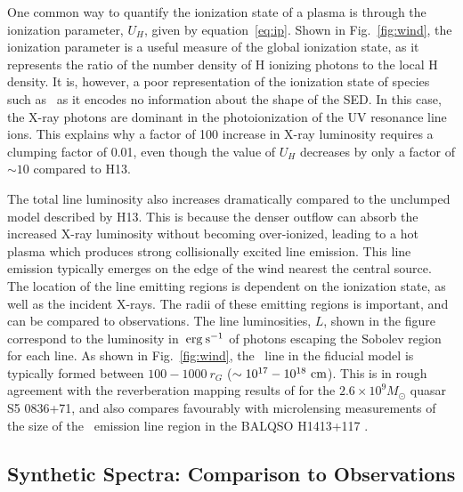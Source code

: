 One common way to quantify the ionization state of a plasma
is through the ionization parameter, $U_H$, given by equation~\ref{eq:ip}.
Shown in Fig.~\ref{fig:wind},
the ionization parameter is a useful measure of the global ionization state,
as it represents the ratio of the number density of 
H ionizing photons to the local H density.
It is, however, a poor representation of the 
ionization state of species such as \civ\ as it encodes no information
about the shape of the SED. In this case, the X-ray photons 
are dominant in the photoionization of the UV resonance line ions. 
This explains why a factor of 100 increase in X-ray luminosity requires
a clumping factor of 0.01, even though the value of $U_H$ decreases by only a factor of $\sim10$ compared to H13. 

The total line luminosity also increases dramatically compared to the unclumped model
described by H13. This is because the denser outflow can absorb the increased
X-ray luminosity without becoming over-ionized, leading to a hot plasma which
produces strong collisionally excited line emission.
This line emission typically emerges on the edge of the wind
nearest the central source. The location of the line emitting regions
is dependent on the ionization state, as well as the incident X-rays.
The radii of these emitting regions is important,
and can be compared to observations. The line luminosities, $L$,
shown in the figure correspond to the luminosity in $\:{\rm erg\:s^{-1}}$ of photons
escaping the Sobolev region for each line. 
As shown in Fig.~\ref{fig:wind},
the \civline\ line in the fiducial model is typically formed between 
$100-1000~r_G$ ($\sim10^{17}-10^{18}~\rm{cm}$).
This is in rough agreement with the reverberation mapping 
results of \cite{kaspi2007} 
for the $2.6\times10^{9} M_\odot$ quasar S5 0836+71,
and also compares favourably with microlensing measurements of the size of the
\civline\ emission line region in the BALQSO H1413+117 \citep{odowd2015}.


\subsection{Synthetic Spectra: Comparison to Observations}

